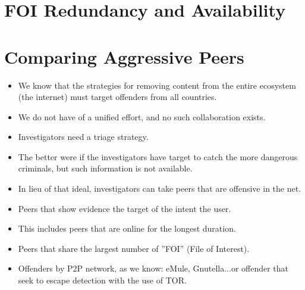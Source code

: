 \documentclass[notes]{beamer}
\begin{document}
\section{FOI Redundancy and Availability}
\begin{frame}

\end{frame}

\section{Comparing Aggressive Peers}
\begin{frame}

\begin{itemize}

\item[\checkmark]We know that the strategies for removing content from the entire ecosystem (the internet) must target offenders from all countries.

\item[\checkmark]We do not have of a unified effort, and no such collaboration exists.

\item[\checkmark]Investigators need a triage strategy.

\item[\checkmark]The better were if the investigators have target to catch the more dangerous criminals, but such information is not available.

\end{itemize}

\end{frame}

\begin{frame}

\begin{itemize}

\item[\checkmark]In lieu of that ideal, investigators can take peers that are offensive in the net.

\item[\checkmark]Peers that show evidence the target of the intent the user.

\item[\checkmark]This includes peers that are online for the longest duration.

\item[\checkmark]Peers that share the largest number of ''FOI'' (File of Interest).

\item[\checkmark]Offenders by P2P network, as we know: eMule, Gnutella...or offender that seek to escape detection with the use of TOR.

\end{itemize}

\end{frame}
\end{document}
